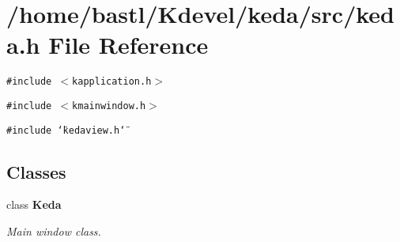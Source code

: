 \section{/home/bastl/Kdevel/keda/src/keda.h File Reference}
\label{keda_8h}
{\tt \#include $<$kapplication.h$>$}\par
{\tt \#include $<$kmainwindow.h$>$}\par
{\tt \#include \char`\"{}kedaview.h\char`\"{}}\par
\subsection*{Classes}
\begin{CompactItemize}
\item 
class {\bf Keda}
\begin{CompactList}\small\item\em Main window class. \item\end{CompactList}\end{CompactItemize}
